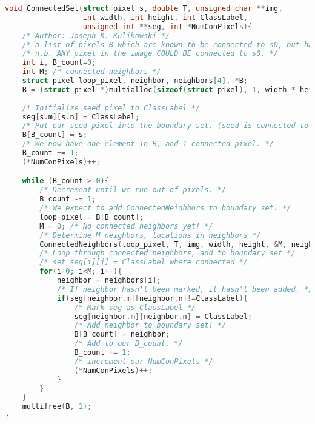 \documentclass{article}
\begin{document}
\begin{lstlisting}[language=C, caption=connected\_neighbors\_sets.c, label={lst:connsets}]
void ConnectedSet(struct pixel s, double T, unsigned char **img,
                  int width, int height, int ClassLabel,
                  unsigned int **seg, int *NumConPixels){
    /* Author: Joseph K. Kulikowski */
    /* a list of pixels B which are known to be connected to s0, but have not yet been searched */
    /* n.b. ANY pixel in the image COULD BE connected to s0. */
    int i, B_count=0;
    int M; /* connected neighbors */
    struct pixel loop_pixel, neighbor, neighbors[4], *B;
    B = (struct pixel *)multialloc(sizeof(struct pixel), 1, width * height);
    
    /* Initialize seed pixel to ClassLabel */
    seg[s.m][s.n] = ClassLabel;
    /* Put our seed pixel into the boundary set. (seed is connected to itself.) */
    B[B_count] = s;
    /* We now have one element in B, and 1 connected pixel. */
    B_count += 1;
    (*NumConPixels)++;

    while (B_count > 0){
        /* Decrement until we run out of pixels. */
        B_count -= 1;
        /* We expect to add ConnectedNeighbors to boundary set. */
        loop_pixel = B[B_count];
        M = 0; /* No connected neighbors yet! */
        /* Determine M neighbors, locations in neighbors */
        ConnectedNeighbors(loop_pixel, T, img, width, height, &M, neighbors);
        /* Loop through connected neighbors, add to boundary set */
        /* set seg[i][j] = ClassLabel where connected */
        for(i=0; i<M; i++){
            neighbor = neighbors[i];
            /* If neighbor hasn't been marked, it hasn't been added. */
            if(seg[neighbor.m][neighbor.n]!=ClassLabel){
                /* Mark seg as ClassLabel */
                seg[neighbor.m][neighbor.n] = ClassLabel;
                /* Add neighbor to boundary set! */
                B[B_count] = neighbor;
                /* Add to our B_count. */
                B_count += 1;
                /* increment our NumConPixels */
                (*NumConPixels)++;
            }
        }
    }
    multifree(B, 1);
}


\end{lstlisting}
\end{document}
